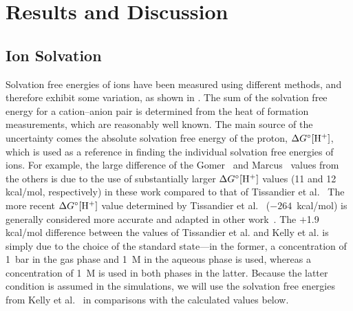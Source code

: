 \section{Results and Discussion}
\subsection{Ion Solvation}
Solvation free energies of ions have been measured using different methods, and therefore exhibit some 
variation, as shown in . The sum of the solvation free energy for a cation--anion pair 
is determined from the heat of formation measurements, which are reasonably well known. The main source 
of the uncertainty comes the absolute solvation free energy of the proton, $\Delta G^{\circ} [{\rm H}^+]$, 
which is used as a reference in finding the individual solvation free energies of ions. For example, the 
large difference of the Gomer~\cite{Gomer1977} and Marcus~\cite{Marcus1994} values from the others is due 
to the use of substantially larger $\Delta  G^{\circ} [{\rm H}^+]$ values (11 and 12 kcal/mol, 
respectively) in these work compared to that of Tissandier et al.~\cite{Tissandier1998} The more recent 
$\Delta G^{\circ} [{\rm H}^+]$ value determined by Tissandier et al.~\cite{Tissandier1998} 
($-264$~kcal/mol) is generally considered more accurate and adapted in other work~\cite{Kelly2006}. 
The $+$1.9 kcal/mol difference between the values of Tissandier et al. and Kelly et al. is simply due 
to the choice of the standard state---in the former, a concentration of 1~bar in the gas phase and 1~M 
in the aqueous phase is used, whereas a concentration of 1~M is used in both phases in the latter. Because 
the latter condition is assumed in the simulations, we will use the solvation free energies from Kelly 
et al.~\cite{Kelly2006} in comparisons with the calculated values below.

\begin{table}[b!]
\caption{\label{solv:tab1}A compilation of experimental solvation free energies of
\Na\ and \Cl\ from various sources.}
\end{table}

